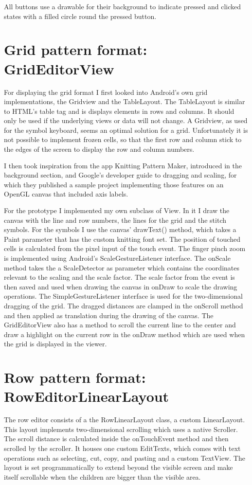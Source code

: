All buttons use a drawable for their background to indicate pressed and clicked states with a filled circle round the pressed button.

\section{Grid pattern format: GridEditorView}
For displaying the grid format I first looked into Android’s own grid implementations, the Gridview and the TableLayout. The TableLayout is similar to HTML’s table tag and is displays elements in rows and columns. It should only be used if the underlying views or data will not change. A Gridview, as used for the symbol keyboard, seems an optimal solution for a grid. Unfortunately it is not possible to implement frozen cells, so that the first row and column stick to the edges of the screen to display the row and column numbers.

I then took inspiration from the app Knitting Pattern Maker, introduced in the background section, and Google’s developer guide to dragging and scaling, for which they published a sample project implementing those features on an OpenGL canvas that included axis labels.

For the prototype I implemented my own subclass of View. In it I draw the canvas with the line and row numbers, the lines for the grid and the stitch symbols. For the symbols I use the canvas’ drawText() method, which takes a Paint parameter that has the custom knitting font set. The position of touched cells is calculated from the pixel input of the touch event. The finger pinch zoom is implemented using Android’s ScaleGestureListener interface. The onScale method takes the a ScaleDetector as parameter which contains the coordinates relevant to the scaling and the scale factor. The scale factor from the event is then saved and used when drawing the canvas in onDraw to scale the drawing operations. The SimpleGestureListener interface is used for the two-dimensional dragging of the grid. The dragged distances are clamped in the onScroll method and then applied as translation during the drawing of the canvas.
The GridEditorView also has a method to scroll the current line to the center and draw a highlight on the current row in the onDraw method which are used when the grid is displayed in the viewer.

\section{Row pattern format: RowEditorLinearLayout}
The row editor consists of a the RowLinearLayout class, a custom LinearLayout. This layout implements two-dimensional scrolling which uses a native Scroller. The scroll distance is calculated inside the onTouchEvent method and then scrolled by the scroller. It houses one custom EditTexts, which comes with text operations such as selecting, cut, copy, and pasting and a custom TextView. The layout is set programmatically to extend beyond the visible screen and make itself scrollable when the children are bigger than the visible area.

